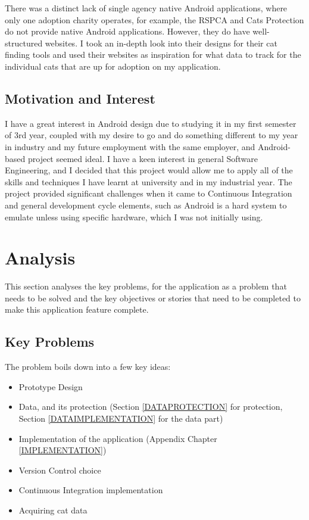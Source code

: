 There was a distinct lack of single agency native Android applications,  where only one adoption charity operates, for example, the RSPCA \cite{RSPCA} and Cats Protection \cite{CATSPROTECTION} do not provide native Android applications. However, they do have well-structured websites. I took an in-depth look into their designs for their cat finding tools and used their websites as inspiration for what data to track for the individual cats that are up for adoption on my application. 

\subsection{Motivation and Interest}
I have a great interest in Android design due to studying it in my first semester of 3rd year, coupled with my desire to go and do something different to my year in industry and my future employment with the same employer, and Android-based project seemed ideal. I have a keen interest in general Software Engineering, and I decided that this project would allow me to apply all of the skills and techniques I have learnt at university and in my industrial year. The project provided significant challenges when it came to Continuous Integration and general development cycle elements, such as Android is a hard system to emulate unless using specific hardware, which I was not initially using.

\section{Analysis}
This section analyses the key problems, for the application as a problem that needs to be solved and the key objectives or stories that need to be completed to make this application feature complete.

\subsection{Key Problems}
The problem boils down into a few key ideas:
\begin{itemize}
    \item Prototype Design
    \item Data, and its protection (Section \ref{DATAPROTECTION} for protection, Section \ref{DATAIMPLEMENTATION} for the data part)
    \item Implementation of the application (Appendix Chapter \ref{IMPLEMENTATION})
    \item Version Control choice 
    \item Continuous Integration implementation
    \item Acquiring cat data
\end{itemize}

